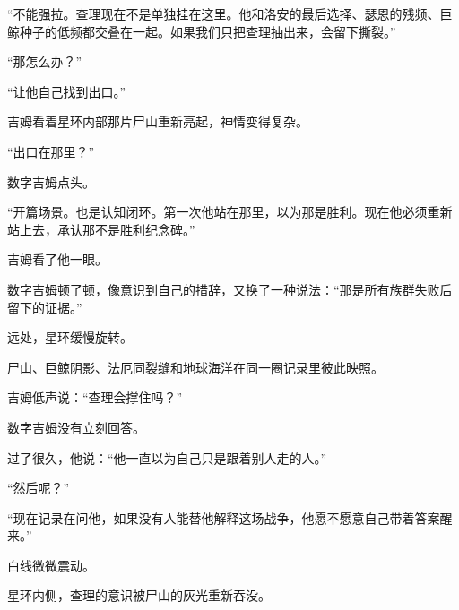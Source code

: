 “不能强拉。查理现在不是单独挂在这里。他和洛安的最后选择、瑟恩的残频、巨鲸种子的低频都交叠在一起。如果我们只把查理抽出来，会留下撕裂。”

“那怎么办？”

“让他自己找到出口。”

吉姆看着星环内部那片尸山重新亮起，神情变得复杂。

“出口在那里？”

数字吉姆点头。

“开篇场景。也是认知闭环。第一次他站在那里，以为那是胜利。现在他必须重新站上去，承认那不是胜利纪念碑。”

吉姆看了他一眼。

数字吉姆顿了顿，像意识到自己的措辞，又换了一种说法：“那是所有族群失败后留下的证据。”

远处，星环缓慢旋转。

尸山、巨鲸阴影、法厄同裂缝和地球海洋在同一圈记录里彼此映照。

吉姆低声说：“查理会撑住吗？”

数字吉姆没有立刻回答。

过了很久，他说：“他一直以为自己只是跟着别人走的人。”

“然后呢？”

“现在记录在问他，如果没有人能替他解释这场战争，他愿不愿意自己带着答案醒来。”

白线微微震动。

星环内侧，查理的意识被尸山的灰光重新吞没。

